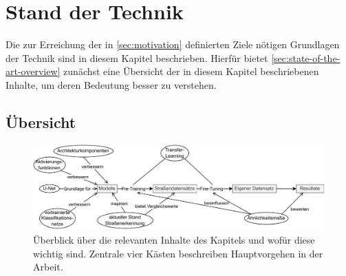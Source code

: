 
\chapter{Stand der Technik}

Die zur Erreichung der in \autoref{sec:motivation} definierten Ziele nötigen Grundlagen der Technik sind 
in diesem Kapitel beschrieben. Hierfür bietet \autoref{sec:state-of-the-art-overview}
\textit{}
zunächst eine Übersicht der in diesem Kapitel beschriebenen Inhalte, um deren Bedeutung besser zu verstehen. 

\section{Übersicht} \label{sec:state-of-the-art-overview}

\begin{figure}[h]
	\centering
	\includegraphics[width=1.\textwidth]{Bilder/overview-background.drawio.pdf} 
	\caption{Überblick über die relevanten Inhalte des Kapitels und wofür diese wichtig sind. Zentrale vier Kästen 
	beschreiben Hauptvorgehen in der Arbeit.}
	\label{fig:overview-background}
\end{figure} 

